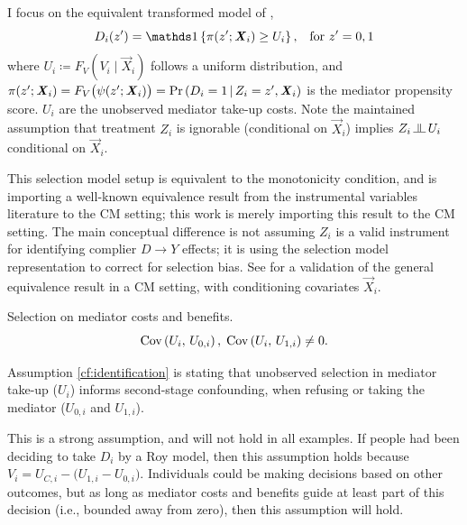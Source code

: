 I focus on the equivalent transformed model of \cite{heckman2005structural},
\[ D_i(z') = \indicator{ \pi(z'; \vec X_i) \geq U_i},
    \;\;\; \text{for } z'=0,1 \]
where $U_i \coloneqq F_V\left( V_i \mid \vec X_i \right)$ follows a uniform distribution, and $\pi(z'; \boldsymbol{\mathit{X}}_i) = F_V\big(\psi(z'; \boldsymbol{\mathit{X}}_i)\big) = \Pr\left( D_i = 1 \, \middle\vert \, Z_i = z', \boldsymbol{\mathit{X}}_i \right)$ is the mediator propensity score.
$U_i$ are the unobserved mediator take-up costs.
Note the maintained assumption that treatment $Z_i$ is ignorable (conditional on $\vec X_i$) implies $Z_i \indep U_i$ conditional on $\vec X_i$.

This selection model setup is equivalent to the monotonicity condition, and is importing a well-known equivalence result from the instrumental variables literature to the CM setting; this work is merely importing this result to the CM setting.
The main conceptual difference is not assuming $Z_i$ is a valid instrument for identifying complier $D \to Y$ effects; it is using the selection model representation to correct for selection bias.
See  for a validation of the general \cite{vytlacil2002independence} equivalence result in a CM setting, with conditioning covariates $\vec X_i$.

\begin{assumptionCF}
    \label{cf:identification}
    Selection on mediator costs and benefits.
    \[ \text{Cov} \left( U_i, \, U_{0,i} \right), \; \text{Cov} \left( U_i, \, U_{1,i} \right) \neq 0. \]
\end{assumptionCF}
\noindent
Assumption \ref{cf:identification} is stating that unobserved selection in mediator take-up ($U_i$) informs second-stage confounding, when refusing or taking the mediator ($U_{0,i}$ and $U_{1,i}$).

This is a strong assumption, and will not hold in all examples.
If people had been deciding to take $D_i$ by a Roy model, then this assumption holds because $V_i = U_{C,i} - \big( U_{1,i} - U_{0,i} \big)$.
Individuals could be making decisions based on other outcomes, but as long as mediator costs and benefits guide at least part of this decision (i.e., bounded away from zero), then this assumption will hold.


